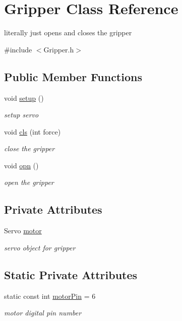 \hypertarget{classGripper}{\section{Gripper Class Reference}
\label{classGripper}
}


literally just opens and closes the gripper  




{\ttfamily \#include $<$Gripper.\-h$>$}

\subsection*{Public Member Functions}
\begin{DoxyCompactItemize}
\item 
void \hyperlink{classGripper_a7eff7781d1109b4e988fa66c8141a6d7}{setup} ()
\begin{DoxyCompactList}\small\item\em setup servo \end{DoxyCompactList}\item 
void \hyperlink{classGripper_a6a54cffb0b8662dc0819646f585acc88}{cls} (int force)
\begin{DoxyCompactList}\small\item\em close the gripper \end{DoxyCompactList}\item 
void \hyperlink{classGripper_ab4fa689ad3f08e97c7fcd10247965ff5}{opn} ()
\begin{DoxyCompactList}\small\item\em open the gripper \end{DoxyCompactList}\end{DoxyCompactItemize}
\subsection*{Private Attributes}
\begin{DoxyCompactItemize}
\item 
Servo \hyperlink{classGripper_ad72d0ae4ccd2be00ec3f303e7a0c1cc9}{motor}
\begin{DoxyCompactList}\small\item\em servo object for gripper \end{DoxyCompactList}\end{DoxyCompactItemize}
\subsection*{Static Private Attributes}
\begin{DoxyCompactItemize}
\item 
static const int \hyperlink{classGripper_ae12467d04d155401f1c6ba694b295f40}{motor\-Pin} = 6
\begin{DoxyCompactList}\small\item\em motor digital pin number \end{DoxyCompactList}\end{DoxyCompactItemize}


